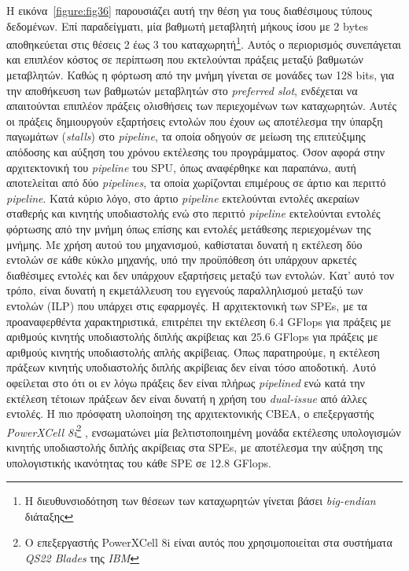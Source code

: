 Η εικόνα~\ref{figure:fig36} παρουσιάζει αυτή την θέση για τους διαθέσιμους τύπους δεδομένων. Επί παραδείγματι, μία βαθμωτή μεταβλητή μήκους ίσου με 2 bytes αποθηκεύεται στις θέσεις 2 έως 3 του καταχωρητή\footnote{\small Η διευθυνσιοδότηση των θέσεων των καταχωρητών γίνεται βάσει \textsl{big-endian} διάταξης}. Αυτός ο περιορισμός συνεπάγεται και επιπλέον κόστος σε περίπτωση που εκτελούνται πράξεις μεταξύ βαθμωτών μεταβλητών. Καθώς η φόρτωση από την μνήμη γίνεται σε μονάδες των 128 bits, για την αποθήκευση των βαθμωτών μεταβλητών στο \textsl{preferred slot}, ενδέχεται να απαιτούνται επιπλέον πράξεις ολισθήσεις των περιεχομένων των καταχωρητών. Αυτές οι πράξεις δημιουργούν εξαρτήσεις εντολών που έχουν ως αποτέλεσμα την ύπαρξη παγωμάτων (\textsl{stalls}) στο \textsl{pipeline}, τα οποία οδηγούν σε μείωση της επιτεύξιμης απόδοσης και αύξηση του χρόνου εκτέλεσης του προγράμματος.\newline \indent
Όσον αφορά στην αρχιτεκτονική του \textsl{pipeline} του \ac{SPU}, όπως αναφέρθηκε και παραπάνω, αυτή αποτελείται από δύο \textsl{pipelines}, τα οποία χωρίζονται επιμέρους σε άρτιο και περιττό \textsl{pipeline}. Κατά κύριο λόγο, στο άρτιο \textsl{pipeline} εκτελούνται εντολές ακεραίων σταθερής και κινητής υποδιαστολής ενώ στο περιττό \textsl{pipeline} εκτελούνται εντολές φόρτωσης από την μνήμη όπως επίσης και εντολές μετάθεσης περιεχομένων της μνήμης. Με χρήση αυτού του μηχανισμού, καθίσταται δυνατή η εκτέλεση δύο εντολών σε κάθε κύκλο μηχανής, υπό την προϋπόθεση ότι υπάρχουν αρκετές διαθέσιμες εντολές και δεν υπάρχουν εξαρτήσεις μεταξύ των εντολών. Κατ' αυτό τον τρόπο, είναι δυνατή η εκμετάλλευση του εγγενούς παραλληλισμού μεταξύ των εντολών (\ac{ILP}) που υπάρχει στις εφαρμογές. \newline \indent
Η αρχιτεκτονική των \acp{SPE}, με τα προαναφερθέντα χαρακτηριστικά, επιτρέπει την εκτέλεση \(6.4\) \acf{GFlops} για πράξεις με αριθμούς κινητής υποδιαστολής διπλής ακρίβειας και \(25.6\) \ac{GFlops} για πράξεις με αριθμούς κινητής υποδιαστολής απλής ακρίβειας. Όπως παρατηρούμε, η εκτέλεση πράξεων κινητής υποδιαστολής διπλής ακρίβειας δεν είναι τόσο αποδοτική. Αυτό οφείλεται στο ότι οι εν λόγω πράξεις δεν είναι πλήρως \textsl{pipelined} ενώ κατά την εκτέλεση τέτοιων πράξεων δεν είναι δυνατή η χρήση του \textsl{dual-issue} από άλλες εντολές. Η πιο πρόσφατη υλοποίηση της αρχιτεκτονικής \ac{CBEA}, ο επεξεργαστής \textsl{PowerXCell 8i}\footnote{\small Ο επεξεργαστής PowerXCell 8i είναι αυτός που χρησιμοποιείται στα συστήματα \textsl{QS22 Blades} της \textsl{IBM}} \cite{PowerXCell}, ενσωματώνει μία βελτιστοποιημένη μονάδα εκτέλεσης υπολογισμών κινητής υποδιαστολής διπλής ακρίβειας στα \acp{SPE}, με αποτέλεσμα την αύξηση της υπολογιστικής ικανότητας του κάθε \ac{SPE} σε \(12.8\) \ac{GFlops}.

